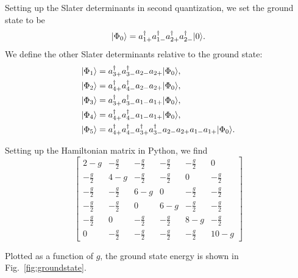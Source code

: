 Setting up the Slater determinants in second quantization, we set the ground state to be
\begin{equation*}
    \lvert\Phi_0\rangle = a_{1+}^\dagger a_{1-}^\dagger a_{2+}^\dagger a_{2-}^\dagger \lvert0\rangle.
\end{equation*}
We define the other Slater determinants relative to the ground state:
\begin{align*}
    \lvert\Phi_1\rangle &= a_{3+}^\dagger a_{3-}^\dagger a_{2-} a_{2+} \lvert\Phi_0\rangle, \\
    \lvert\Phi_2\rangle &= a_{4+}^\dagger a_{4-}^\dagger a_{2-} a_{2+} \lvert\Phi_0\rangle, \\
    \lvert\Phi_3\rangle &= a_{3+}^\dagger a_{3-}^\dagger a_{1-} a_{1+} \lvert\Phi_0\rangle, \\
    \lvert\Phi_4\rangle &= a_{4+}^\dagger a_{4-}^\dagger a_{1-} a_{1+} \lvert\Phi_0\rangle, \\
    \lvert\Phi_5\rangle &= a_{4+}^\dagger a_{4-}^\dagger a_{3+}^\dagger a_{3-}^\dagger a_{2-} a_{2+} a_{1-} a_{1+} \lvert\Phi_0\rangle.
\end{align*}

Setting up the Hamiltonian matrix in Python, we find
\begin{equation*}
    \begin{bmatrix}
        2 - g & - \frac{g}{2} & - \frac{g}{2} & - \frac{g}{2} & - \frac{g}{2} & 0 \\
        - \frac{g}{2} & 4 - g & - \frac{g}{2} & - \frac{g}{2} & 0 & - \frac{g}{2} \\
        - \frac{g}{2} & - \frac{g}{2} & 6 - g & 0 & - \frac{g}{2} & - \frac{g}{2} \\
        - \frac{g}{2} & - \frac{g}{2} & 0 & 6 - g & - \frac{g}{2} & - \frac{g}{2} \\
        - \frac{g}{2} & 0 & - \frac{g}{2} & - \frac{g}{2} & 8 - g & - \frac{g}{2} \\
        0 & - \frac{g}{2} & - \frac{g}{2} & - \frac{g}{2} & - \frac{g}{2} & 10 - g
    \end{bmatrix}
\end{equation*}

Plotted as a function of $g$, the ground state energy is shown in Fig.~\ref{fig:groundstate}.

